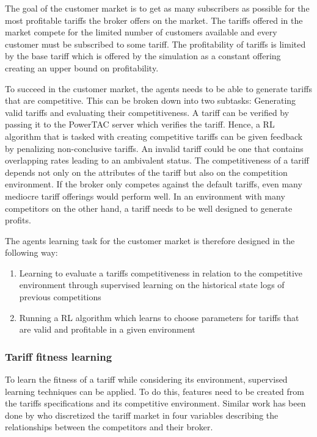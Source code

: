 The goal of the customer market is to get as many subscribers as possible for the most profitable tariffs the broker
offers on the market. The tariffs offered in the market compete for the limited number of customers available and every
customer must be subscribed to some tariff. The profitability of tariffs is limited by the base tariff which is offered
by the simulation as a constant offering creating an upper bound on profitability. 

To succeed in the customer market, the agents needs to be able to generate tariffs that are competitive. This can be
broken down into two subtasks: Generating valid tariffs and evaluating their competitiveness. A tariff can be verified
by passing it to the \ac {PowerTAC} server which verifies the tariff. Hence, a \ac {RL} algorithm that is tasked with
creating competitive tariffs can be given feedback by penalizing non-conclusive tariffs. An invalid tariff could be one
that contains overlapping rates leading to an ambivalent status. The competitiveness of a tariff depends not only on the
attributes of the tariff but also on the competition environment. If the broker only competes against the default
tariffs, even many mediocre tariff offerings would perform well. In an environment with many competitors on the other
hand, a tariff needs to be well designed to generate profits. 

The agents learning task for the customer market is therefore designed in the following way:

\begin{enumerate} \item Learning to evaluate a tariffs competitiveness in relation to the competitive environment
	through supervised learning on the historical state logs of previous competitions \item Running a \ac {RL}
	algorithm which learns to choose parameters for tariffs that are valid and profitable in a given environment
\end{enumerate}

\subsubsection{Tariff fitness learning} To learn the fitness of a tariff while considering its environment, supervised
learning techniques can be applied. To do this, features need to be created from the tariffs specifications and its
competitive environment. Similar work has been done by \citep{cuevas2015distributed} who discretized the tariff market
in four variables describing the relationships between the competitors and their broker.   

